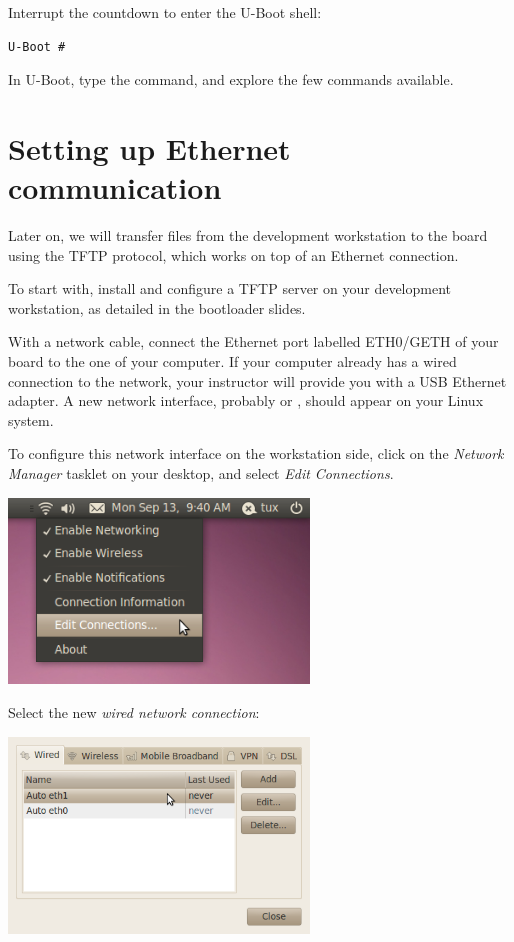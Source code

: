 Interrupt the countdown to enter the U-Boot shell:
\begin{verbatim}
U-Boot #
\end{verbatim}

In U-Boot, type the  command, and explore the few commands
available.

\section{Setting up Ethernet communication}

Later on, we will transfer files from the development workstation to
the board using the TFTP protocol, which works on top of an Ethernet
connection.

To start with, install and configure a TFTP server on your development
workstation, as detailed in the bootloader slides.

With a network cable, connect the Ethernet port labelled ETH0/GETH of
your board to the one of your computer. If your computer already has a
wired connection to the network, your instructor will provide you with
a USB Ethernet adapter. A new network interface, probably 
or , should appear on your Linux system.

To configure this network interface on the workstation side, click on
the {\em Network Manager} tasklet on your desktop, and select {\em
  Edit Connections}.

\begin{center}
\includegraphics[width=8cm]{labs/sysdev-u-boot/network-config-1.png}
\end{center}

Select the new {\em wired network connection}:

\begin{center}
\includegraphics[width=8cm]{labs/sysdev-u-boot/network-config-2.png}
\end{center}

